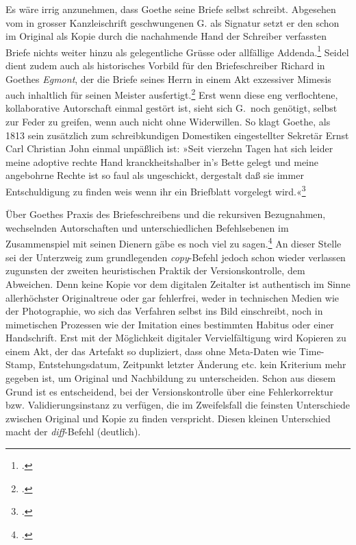 \documentclass[a4paper,11pt]{article}
\newcommand{\anf}[1]{»#1«}
\begin{document}
Es wäre irrig anzunehmen, dass Goethe seine Briefe selbst schreibt. Abgesehen vom in grosser Kanzleischrift geschwungenen G. als Signatur setzt er den schon im Original als Kopie durch die nachahmende Hand der Schreiber verfassten Briefe nichts weiter hinzu als gelegentliche Grüsse oder allfällige Addenda.\footcite[40]{schleif:1965} Seidel dient zudem auch als historisches Vorbild für den Briefeschreiber Richard in Goethes \emph{Egmont}, der die Briefe seines Herrn in einem Akt exzessiver Mimesis auch inhaltlich für seinen Meister ausfertigt.\footcite[Vgl.][253–256]{krajewski:2010} Erst wenn diese eng verflochtene, kollaborative Autorschaft einmal gestört ist, sieht sich G.\ noch genötigt, selbst zur Feder zu greifen, wenn auch nicht ohne Widerwillen. So klagt Goethe, als 1813 sein zusätzlich zum schreibkundigen Domestiken eingestellter Sekretär Ernst Carl Christian John einmal unpäßlich ist: \anf{Seit vierzehn Tagen hat sich leider meine adoptive rechte Hand kranckheitshalber in's Bette gelegt und meine angebohrne Rechte ist so faul als ungeschickt, dergestalt daß sie immer Entschuldigung zu finden weis wenn ihr ein Briefblatt  vorgelegt wird.}\footcite[][Nachträge: Briefe, Bd.~51, S.~342]{goethe:1887}

Über Goethes Praxis des Briefeschreibens und die rekursiven Bezugnahmen, wechselnden Autorschaften und unterschiedlichen Befehlsebenen im Zusammenspiel mit seinen Dienern gäbe es noch viel zu sagen.\footcites[Vgl.][]{krajewski:2010}[sowie][]{schoene:2015} An dieser Stelle sei der Unterzweig zum grundlegenden \emph{copy}-Befehl jedoch schon wieder verlassen zugunsten der zweiten heuristischen Praktik der Versionskontrolle, dem Abweichen. Denn keine Kopie vor dem digitalen Zeitalter ist authentisch im Sinne allerhöchster Originaltreue oder gar fehlerfrei, weder in technischen Medien wie der Photographie, wo sich das Verfahren selbst ins Bild einschreibt, noch in mimetischen Prozessen wie der Imitation eines bestimmten Habitus oder einer Handschrift. Erst mit der Möglichkeit digitaler Vervielfältigung wird Kopieren zu einem Akt, der das Artefakt so dupliziert, dass ohne Meta-Daten wie Time-Stamp, Entstehungsdatum, Zeitpunkt letzter Änderung etc. kein Kriterium mehr gegeben ist, um Original und Nachbildung zu unterscheiden. Schon aus diesem Grund ist es entscheidend, bei der Versionskontrolle über eine Fehlerkorrektur bzw. Validierungsinstanz zu verfügen, die im Zweifelsfall die feinsten Unterschiede zwischen Original und Kopie zu finden verspricht. Diesen kleinen Unterschied macht der \emph{diff}-Befehl (deutlich).
\end{document}
